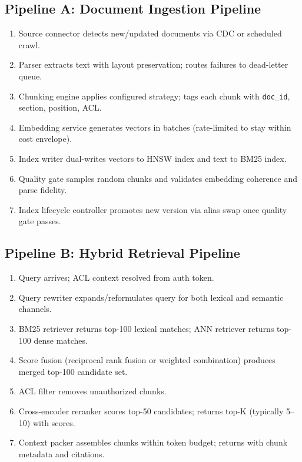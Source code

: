 \subsection*{Pipeline A: Document Ingestion Pipeline}

\begin{enumerate}
  \item Source connector detects new/updated documents via CDC or scheduled crawl.
  \item Parser extracts text with layout preservation; routes failures to dead-letter queue.
  \item Chunking engine applies configured strategy; tags each chunk with \texttt{doc\_id}, section, position, ACL.
  \item Embedding service generates vectors in batches (rate-limited to stay within cost envelope).
  \item Index writer dual-writes vectors to HNSW index and text to BM25 index.
  \item Quality gate samples random chunks and validates embedding coherence and parse fidelity.
  \item Index lifecycle controller promotes new version via alias swap once quality gate passes.
\end{enumerate}

\subsection*{Pipeline B: Hybrid Retrieval Pipeline}

\begin{enumerate}
  \item Query arrives; ACL context resolved from auth token.
  \item Query rewriter expands/reformulates query for both lexical and semantic channels.
  \item BM25 retriever returns top-100 lexical matches; ANN retriever returns top-100 dense matches.
  \item Score fusion (reciprocal rank fusion or weighted combination) produces merged top-100 candidate set.
  \item ACL filter removes unauthorized chunks.
  \item Cross-encoder reranker scores top-50 candidates; returns top-K (typically 5--10) with scores.
  \item Context packer assembles chunks within token budget; returns with chunk metadata and citations.
\end{enumerate}


